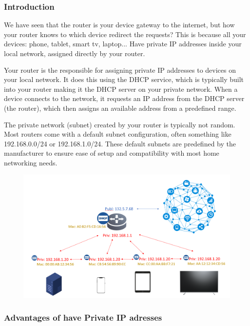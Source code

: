 \documentclass{article}
\begin{document}
\subsubsection{Introduction}

We have seen that the router is your device gateway to the internet, but how your router knows to which device redirect the requests? This is because all your devices: phone, tablet, smart tv, laptop... Have private IP addresses inside your local network, assigned directly by your router.

Your router is the responsible for assigning private IP addresses to devices on your local network. It does this using the DHCP service, which is typically built into your router making it the DHCP server on your private network. When a device connects to the network, it requests an IP address from the DHCP server (the router), which then assigns an available address from a predefined range.

The private network (subnet) created by your router is typically not random. Most routers come with a default subnet configuration, often something like 192.168.0.0/24 or 192.168.1.0/24. These default subnets are predefined by the manufacturer to ensure ease of setup and compatibility with most home networking needs.

\begin{figure}[H]
    \includegraphics[width=\textwidth]{pictures/network.png}
    \centering
\end{figure}

\subsubsection{Advantages of have Private IP adresses}
\end{document}
